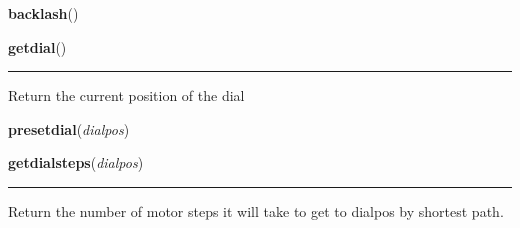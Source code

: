     \label{wheel:backlash}

    \vspace{0.5ex}

    \begin{boxedminipage}{\textwidth}

    \raggedright \textbf{backlash}()

    \end{boxedminipage}

    \label{wheel:getdial}

    \vspace{0.5ex}

    \begin{boxedminipage}{\textwidth}

    \raggedright \textbf{getdial}()

    \vspace{-1.5ex}

    \rule{\textwidth}{0.5\fboxrule}
    Return the current position of the dial

    \vspace{1ex}

    \end{boxedminipage}

    \label{wheel:presetdial}

    \vspace{0.5ex}

    \begin{boxedminipage}{\textwidth}

    \raggedright \textbf{presetdial}(\textit{dialpos})

    \end{boxedminipage}

    \label{wheel:getdialsteps}

    \vspace{0.5ex}

    \begin{boxedminipage}{\textwidth}

    \raggedright \textbf{getdialsteps}(\textit{dialpos})

    \vspace{-1.5ex}

    \rule{\textwidth}{0.5\fboxrule}
    Return the number of motor steps it will take to get to dialpos by 
    shortest path.

    \vspace{1ex}

    \end{boxedminipage}

